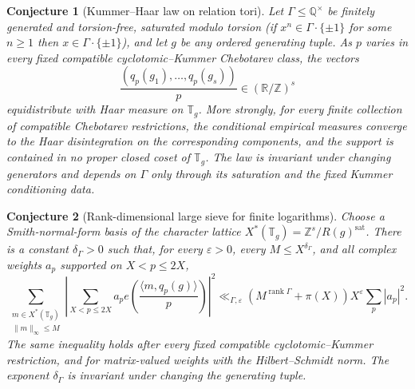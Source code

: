 \documentclass[11pt]{article}
\newtheorem{conjecture}{Conjecture}
\theoremstyle{definition}
\newcommand{\rank}{\operatorname{rank}}
\newcommand{\Z}{\mathbb Z}
\newcommand{\Q}{\mathbb Q}
\newcommand{\R}{\mathbb R}
\newcommand{\T}{\mathbb T}
\newcommand{\eps}{\varepsilon}
\providecommand{\Z}{\mathbb Z}
\providecommand{\Q}{\mathbb Q}
\providecommand{\R}{\mathbb R}
\providecommand{\T}{\mathbb T}
\begin{document}
\begin{conjecture}[Kummer--Haar law on relation tori]\label{s11}
Let $\Gamma\le\Q^\times$ be finitely generated and torsion-free, saturated modulo torsion (if $x^n\in\Gamma\cdot\{\pm1\}$ for some $n\ge1$ then $x\in\Gamma\cdot\{\pm1\}$), and let
$g$ be any ordered generating tuple.  As $p$ varies in every fixed compatible
cyclotomic--Kummer Chebotarev class, the vectors
\[
 \frac{(q_p(g_1),\ldots,q_p(g_s))}{p}\in(\R/\Z)^s
\]
equidistribute with Haar measure on $\T_g$.  More strongly, for every finite collection
of compatible Chebotarev restrictions, the conditional empirical measures converge to
the Haar disintegration on the corresponding components, and the support is contained in no
proper closed coset of $\T_g$.  The law is invariant under changing generators and
depends on $\Gamma$ only through its saturation and the fixed Kummer conditioning data.
\end{conjecture}

\begin{conjecture}[Rank-dimensional large sieve for finite logarithms]\label{s12}
Choose a Smith-normal-form basis of the character lattice
$X^*(\T_g)=\Z^s/R(g)^{\mathrm{sat}}$.  There is a constant $\delta_\Gamma>0$ such that,
for every $\eps>0$, every $M\le X^{\delta_\Gamma}$, and all complex weights $a_p$
supported on $X<p\le2X$,
\[
 \sum_{\substack{m\in X^*(\T_g)\\\|m\|_\infty\le M}}
 \left|\sum_{X<p\le2X}a_p
 e\!\left(\frac{\langle m,q_p(g)\rangle}{p}\right)\right|^2
 \ll_{\Gamma,\eps}(M^{\rank\Gamma}+\pi(X))X^\eps\sum_p|a_p|^2.
\]
The same inequality holds after every fixed compatible cyclotomic--Kummer restriction,
and for matrix-valued weights with the Hilbert--Schmidt norm.  The exponent
$\delta_\Gamma$ is invariant under changing the generating tuple.
\end{conjecture}
\end{document}
